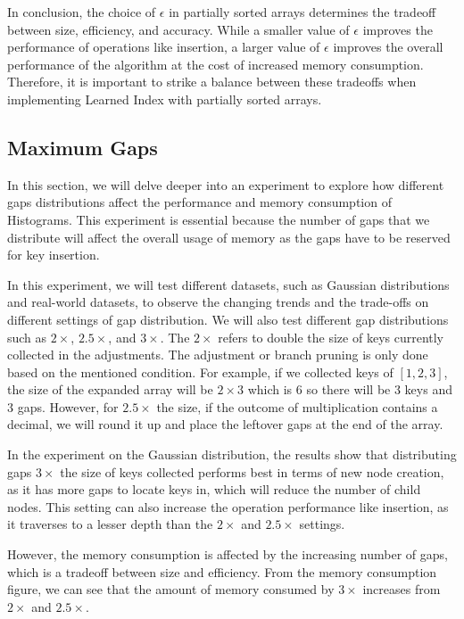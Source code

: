 \documentclass[11pt,a4paper]{article}
\newcommand{\learnindex}{\textsf{Learned Index}\xspace}
\begin{document}
In conclusion, the choice of $\epsilon$ in partially sorted arrays determines the tradeoff between size, efficiency, and accuracy. While a smaller value of $\epsilon$ improves the performance of operations like insertion, a larger value of $\epsilon$ improves the overall performance of the algorithm at the cost of increased memory consumption. Therefore, it is important to strike a balance between these tradeoffs when implementing \learnindex with partially sorted arrays.

\subsection{Maximum Gaps} In this section, we will delve deeper into an experiment to explore how different gaps distributions affect the performance and memory consumption of Histograms. This experiment is essential because the number of gaps that we distribute will affect the overall usage of memory as the gaps have to be reserved for key insertion.

In this experiment, we will test different datasets, such as Gaussian distributions and real-world datasets, to observe the changing trends and the trade-offs on different settings of gap distribution. We will also test different gap distributions such as $2\times$, $2.5\times$, and $3\times$. The $2\times$ refers to double the size of keys currently collected in the adjustments. The adjustment or branch pruning is only done based on the mentioned condition. For example, if we collected keys of $[1,2,3]$, the size of the expanded array will be $2\times 3$ which is $6$ so there will be $3$ keys and $3$ gaps. However, for $2.5\times$ the size, if the outcome of multiplication contains a decimal, we will round it up and place the leftover gaps at the end of the array.

In the experiment on the Gaussian distribution, the results show that distributing gaps $3\times$ the size of keys collected performs best in terms of new node creation, as it has more gaps to locate keys in, which will reduce the number of child nodes. This setting can also increase the operation performance like insertion, as it traverses to a lesser depth than the $2\times$ and $2.5\times$ settings.

However, the memory consumption is affected by the increasing number of gaps, which is a tradeoff between size and efficiency. From the memory consumption figure, we can see that the amount of memory consumed by $3\times$ increases from $2\times$ and $2.5\times$.
\end{document}
